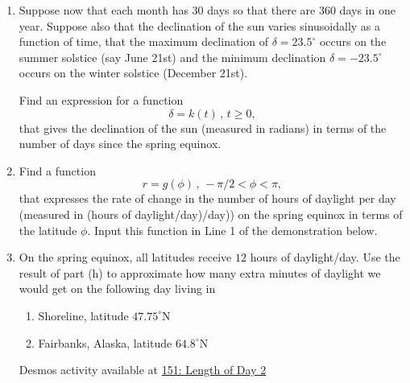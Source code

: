 \documentclass{ximera}
\newcommand{\pskip}{\vskip 0.1 in}
\begin{document}
\begin{question}
\begin{enumerate}
\begin{onlineOnly}
    \begin{center}
\end{center}
\end{onlineOnly}

Desmos activity available at \href{https://www.desmos.com/calculator/ifomatkcta}{151: Length of Day 1}

\pskip 

\item Suppose now that each month has 30 days so that there are 360 days in one year. Suppose also that the declination of the sun varies sinusoidally as a function of time, that the maximum declination of $\delta = 23.5^\circ$ occurs on the summer solstice (say June 21st) and the minimum declination $\delta = -23.5^\circ$ occurs on the winter solstice (December 21st). 

Find an expression for a function
\[
     \delta = k(t) \, , \, t\geq 0,
\]
that gives the declination of the sun (measured in radians) in terms of the number of days since the spring equinox. 

\item Find a function
\[
   r = g(\phi) \, , \, -\pi/2 < \phi < \pi ,
\]
that expresses the rate of change in the number of hours of daylight per day (measured in (hours of daylight/day)/day)) on the spring equinox in terms of the latitude $\phi$. Input this function in Line 1 of the demonstration below.

\item On the spring equinox, all latitudes receive $12$ hours of daylight/day. Use the result of part (h) to approximate how many extra minutes of daylight we would get on the following day living in 

\begin{enumerate}
\item Shoreline, latitude $47.75^\circ$N

\item Fairbanks, Alaska, latitude $64.8^\circ$N

\end{enumerate}

\begin{onlineOnly}
    \begin{center}
\end{center}
\end{onlineOnly}

Desmos activity available at \href{https://www.desmos.com/calculator/nf8n5uphhl}{151: Length of Day 2}

\end{enumerate}

\end{question}
\end{document}
